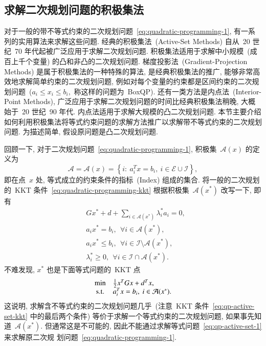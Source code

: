 \subsection{求解二次规划问题的积极集法}
\label{subsec:7.2.2}

对于一般的带不等式约束的二次规划问题~\eqref{eq:quadratic-programming-1}, 有一系列的实用算法来求解这些问题. 经典的积极集法~(Active-Set Methods) 自从~20 世纪~70 年代起被广泛应用于求解二次规划问题. 积极集法适用于求解中小规模~(成百上千个变量) 的凸和非凸的二次规划问题. 梯度投影法~(Gradient-Projection Methods) 是属于积极集法的一种特殊的算法, 是经典积极集法的推广, 能够非常高效地求解简单约束的二次规划问题, 例如对每个变量的约束都是区间约束的二次规划问题~($a_i \leqslant x_i \leqslant b_i,$ 称这样的问题为~BoxQP). 还有一类方法是内点法~(Interior-Point Methods), 广泛应用于求解二次规划问题的时间比经典积极集法稍晚, 大概始于~20 世纪~90 年代. 内点法适用于求解大规模的凸二次规划问题. 本节主要介绍如何利用积极集法将等式约束问题的求解方法推广以求解带不等式约束的二次规划问题. 为描述简单, 假设原问题是凸二次规划问题.

回顾一下, 对于二次规划问题~\eqref{eq:quadratic-programming-1}, 积极集~$\mathcal{A}(x)$ 的定义为
\begin{equation}
\label{eq:qp-active-set}
\mathcal{A} = \mathcal{A}({x}) = \left\{ i : ~ {a}_i^T {x} = b_i, ~ i \in \mathcal{E} \cup \mathcal{I} \right\},
\end{equation}
即在点~${x}$ 处, 等式成立的约束条件的指标~(Index) 组成的集合.
将一般的二次规划的~KKT 条件~\eqref{eq:quadratic-programming-kkt} 根据积极集~$\mathcal{A}({x}^*)$ 改写一下, 即有
\begin{equation}
\label{eq:qp-active-set-kkt}
\begin{aligned}
& G {x}^* + d + \sum\limits_{i \in \mathcal{A}({x}^*)} \lambda_i^* {a}_i = {0}, \\
& {a}_i {x}^* = b_i, ~~ \forall i \in \mathcal{A}({x}^*), \\
& {a}_i {x}^* \leqslant b_i, ~~ \forall i \in \mathcal{I} \setminus \mathcal{A}({x}^*), \\
& \lambda_i^* \geqslant 0, ~~ \forall i \in \mathcal{I} \cap \mathcal{A}({x}^*).
\end{aligned}
\end{equation}
不难发现, ${x}^*$ 也是下面等式问题的~KKT 点
\begin{equation}
\label{eq:qp-active-set-1}
\begin{array}{cl}
\min & \frac{1}{2} {x}^T G {x} + {d}^T {x}, \\
{\rm s.t.} & {a}_i^T {x} = b_i, ~ i \in \mathcal{A}({x}^*).
\end{array}
\end{equation}
这说明, 求解含不等式约束的二次规划问题几乎~(注意~KKT 条件~\eqref{eq:qp-active-set-kkt} 中的最后两个条件) 等价于求解一个等式约束的二次规划问题, 如果事先知道~$\mathcal{A}({x}^*).$ 但通常这是不可能的, 因此不能通过求解等式问题~\eqref{eq:qp-active-set-1} 来求解原二次规
划问题~\eqref{eq:quadratic-programming-1}.


